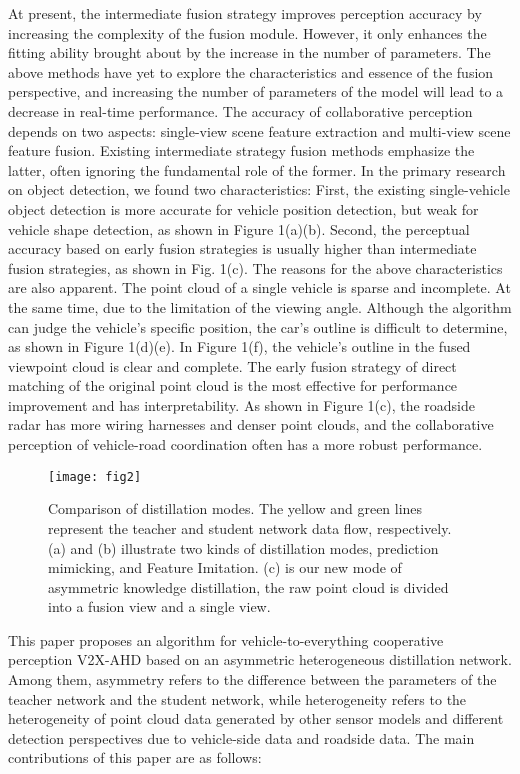 \documentclass[lettersize,journal]{IEEEtran}
\begin{document}
At present, the intermediate fusion strategy improves perception accuracy by increasing the complexity of the fusion module. However, it only enhances the fitting ability brought about by the increase in the number of parameters. The above methods have yet to explore the characteristics and essence of the fusion perspective, and increasing the number of parameters of the model will lead to a decrease in real-time performance. The accuracy of collaborative perception depends on two aspects: single-view scene feature extraction and multi-view scene feature fusion. Existing intermediate strategy fusion methods emphasize the latter, often ignoring the fundamental role of the former. In the primary research on object detection, we found two characteristics: First, the existing single-vehicle object detection is more accurate for vehicle position detection, but weak for vehicle shape detection, as shown in Figure 1(a)(b). Second, the perceptual accuracy based on early fusion strategies is usually higher than intermediate fusion strategies, as shown in Fig. 1(c). The reasons for the above characteristics are also apparent. The point cloud of a single vehicle is sparse and incomplete. At the same time, due to the limitation of the viewing angle. Although the algorithm can judge the vehicle's specific position, the car's outline is difficult to determine, as shown in Figure 1(d)(e). In Figure 1(f), the vehicle's outline in the fused viewpoint cloud is clear and complete. The early fusion strategy of direct matching of the original point cloud is the most effective for performance improvement and has interpretability. As shown in Figure 1(c), the roadside radar has more wiring harnesses and denser point clouds, and the collaborative perception of vehicle-road coordination often has a more robust performance.

\begin{figure*}[!t]
\centering
\texttt{[image: fig2]}
\caption{Comparison of distillation modes. The yellow and green lines represent the teacher and student network data flow, respectively. (a) and (b) illustrate two kinds of distillation modes, prediction mimicking, and Feature Imitation. (c) is our new mode of asymmetric knowledge distillation, the raw point cloud is divided into a fusion view and a single view.}
\label{fig_2}
\end{figure*}

This paper proposes an algorithm for vehicle-to-everything cooperative perception V2X-AHD based on an asymmetric heterogeneous distillation network. Among them, asymmetry refers to the difference between the parameters of the teacher network and the student network, while heterogeneity refers to the heterogeneity of point cloud data generated by other sensor models and different detection perspectives due to vehicle-side data and roadside data. The main contributions of this paper are as follows:
\end{document}

